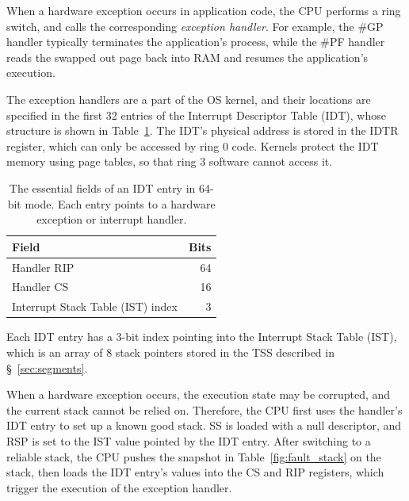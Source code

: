 
When a hardware exception occurs in application code, the CPU performs a ring
switch, and calls the corresponding \textit{exception handler}. For example,
the \#GP handler typically terminates the application's process, while the \#PF
handler reads the swapped out page back into RAM and resumes the application's
execution.

The exception handlers are a part of the OS kernel, and their locations are
specified in the first 32 entries of the Interrupt Descriptor Table (IDT),
whose structure is shown in Table~\ref{fig:idt_entry}. The IDT's physical
address is stored in the IDTR register, which can only be accessed by ring 0
code. Kernels protect the IDT memory using page tables, so that ring 3 software
cannot access it.

\begin{table}[hbt]
  \centering
  \begin{tabular}{| l | r |}
  \hline
  \textbf{Field} & \textbf{Bits} \\
  \hline
  Handler RIP & 64 \\
  \hline
  Handler CS & 16 \\
  \hline
  Interrupt Stack Table (IST) index & 3 \\
  \hline
  \end{tabular}
  \caption{
    The essential fields of an IDT entry in 64-bit mode. Each entry points to a
    hardware exception or interrupt handler.
  }
  \label{fig:idt_entry}
\end{table}

Each IDT entry has a 3-bit index pointing into the Interrupt Stack Table (IST),
which is an array of 8 stack pointers stored in the TSS described in
\S~\ref{sec:segments}.


When a hardware exception occurs, the execution state may be corrupted, and the
current stack cannot be relied on. Therefore, the CPU first uses the handler's
IDT entry to set up a known good stack. SS is loaded with a null descriptor,
and RSP is set to the IST value pointed by the IDT entry. After switching to a
reliable stack, the CPU pushes the snapshot in Table~\ref{fig:fault_stack} on
the stack, then loads the IDT entry's values into the CS and RIP registers,
which trigger the execution of the exception handler.

